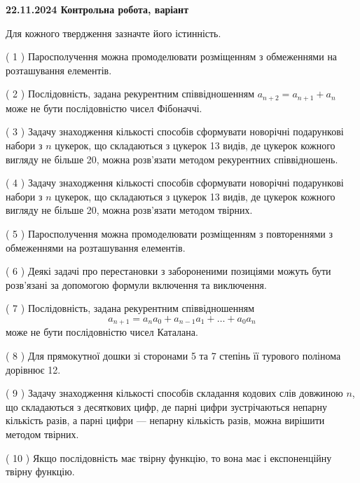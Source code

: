 \documentclass[12pt, ukrainian]{article}
\begin{document}
\vspace{4mm}
\newpage
\begin {large}

\textbf{22.11.2024 Контрольна робота, варіант  }\par


{
Для кожного твердження зазначте його істинність.\par
\vspace{2mm}
( 1 ) Паросполучення можна промоделювати розміщенням з обмеженнями на розташування елементів.%

( 2 ) Послідовність, задана рекурентним співвідношенням $a_{n+2}=a_{n+1}+a_{n}$ може не бути послідовністю чисел Фібоначчі.%

( 3 ) Задачу знаходження кількості способів сформувати новорічні подарункові набори з $n$ цукерок, що складаються з цукерок 13 видів, де цукерок кожного вигляду не більше 20, можна розв’язати методом рекурентних співвідношень.%

( 4 ) Задачу знаходження кількості способів сформувати новорічні подарункові набори з $n$ цукерок, що складаються з цукерок 13 видів, де цукерок кожного вигляду не більше 20, можна розв’язати методом твірних.%

( 5 ) Паросполучення можна промоделювати розміщенням з повтореннями з обмеженнями на розташування елементів.%

( 6 ) Деякі задачі про перестановки з забороненими позиціями можуть бути розв’я\-за\-ні за допомогою формули включення та виключення.%

( 7 ) Послідовність, задана рекурентним співвідношенням $$a_{n+1}=a_{n}a_{0}+a_{n-1}a_{1}+\ldots+a_0a_{n}$$ може не бути послідовністю чисел Каталана.%

( 8 ) Для прямокутної дошки зі сторонами 5 та 7 степінь її турового полінома дорівнює 12.%

( 9 ) Задачу знаходження кількості способів складання кодових слів довжиною $n$, що складаються з десяткових цифр, де парні цифри зустрічаються непарну кількість разів, а парні цифри — непарну кількість разів, можна вирішити методом твірних.%

( 10 ) Якщо послідовність має твірну функцію, то вона має і експоненційну твірну функцію.%


\vspace{5mm}
}
\end {large}
\end{document}
